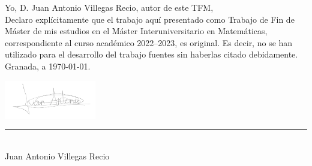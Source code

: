 \noindent Yo, D. Juan Antonio Villegas Recio, autor de este TFM, \\
\newline
Declaro explícitamente que el trabajo aquí presentado como Trabajo de Fin de Máster de mis estudios en el Máster Interuniversitario en Matemáticas, correspondiente al curso académico 2022--2023, es original. Es decir, no se han utilizado para el desarrollo del trabajo fuentes sin haberlas citado debidamente. \\
\newline
Granada, a \today.

\vspace{0cm}
\noindent\includegraphics[width=0.3\textwidth]{img/firma.png}

\vspace*{-1.1cm}
\noindent \rule{0.3\textwidth}{.3pt}\\
\vspace{0.3cm}
\noindent \large{Juan Antonio Villegas Recio}